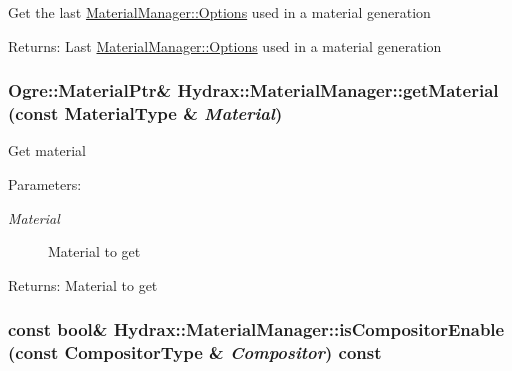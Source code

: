 \begin{CompactItemize}
Get the last \hyperlink{struct_hydrax_1_1_material_manager_1_1_options}{MaterialManager::Options} used in a material generation \begin{Desc}
\item[Returns:]Last \hyperlink{struct_hydrax_1_1_material_manager_1_1_options}{MaterialManager::Options} used in a material generation \end{Desc}
\hypertarget{class_hydrax_1_1_material_manager_648e7cd626194ea34c31a4bf422cdf4d}{
\subsubsection[{getMaterial}]{\setlength{\rightskip}{0pt plus 5cm}Ogre::MaterialPtr\& Hydrax::MaterialManager::getMaterial (const {\bf MaterialType} \& {\em Material})}}
\label{class_hydrax_1_1_material_manager_648e7cd626194ea34c31a4bf422cdf4d}


Get material \begin{Desc}
\item[Parameters:]
\begin{description}
\item[{\em Material}]Material to get \end{description}
\end{Desc}
\begin{Desc}
\item[Returns:]Material to get \end{Desc}
\hypertarget{class_hydrax_1_1_material_manager_f2ede2086a254c2bf07afd42227b9f31}{
\subsubsection[{isCompositorEnable}]{\setlength{\rightskip}{0pt plus 5cm}const bool\& Hydrax::MaterialManager::isCompositorEnable (const {\bf CompositorType} \& {\em Compositor}) const}}
\label{class_hydrax_1_1_material_manager_f2ede2086a254c2bf07afd42227b9f31}



\end{CompactItemize}
